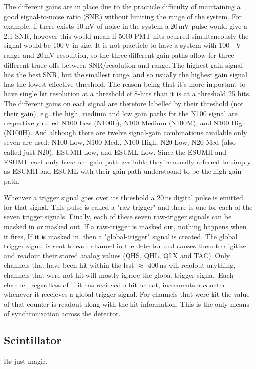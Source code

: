 The different gains are in place due to the practicle difficulty of maintaining
a good signal-to-noise ratio (SNR) without limiting the range of the
system.
For example, if there exists 10\,mV of noise in the system a 20\,mV pulse
would give a 2:1 SNR, however this would mean if 5000 PMT hits ocurred simultaneously
the signal would be 100\,V in size.
It is not practicle to have a system with 100+\,V range and 20\,mV resoultion,
so the three different gain paths allow for three different trade-offs between
SNR/resolution and range.
The highest gain signal has the best SNR, but the smallest range, and so usually
the highest gain signal has the lowest effective threshold.
The reason being that it's more important to have single hit resolution at a threshold
of 8-hits than it is at a threshold 25 hits.
The different gains on each signal are therefore labelled by their threshold (not their gain), e.g.
the high, medium and low gain paths for the N100 signal are respectively called
N100 Low (N100L), N100 Medium (N100M), and N100 High (N100H).
And although there are twelve signal-gain combinations available only seven are
used: N100-Low, N100-Med., N100-High, N20-Low, N20-Med (also called just N20), ESUMH-Low, and ESUML-Low.
Since the ESUMH and ESUML each only have one gain path available they're usually
referred to simply as ESUMH and ESUML with their gain path understoond to be
the high gain path.

Whenver a trigger signal goes over its threshold a 20\,ns digital pulse is
emitted for that signal. This pulse is called a "raw-trigger" and there is
one for each of the seven trigger signals.
Finally, each of these seven raw-trigger signals can be masked in or masked out.
If a raw-trigger is masked out, nothing happens when it fires,
If it is masked in, then a "global-trigger" signal is created.
The global trigger signal is sent to each channel in the detector and
causes them to digitize and readout their stored analog values (QHS, QHL, QLX and TAC).
Only channels that have been hit within the last $\approx$ 400\,ns will readout
anything, channels that were not hit will mostly ignore the global trigger signal.
Each channel, regardless of if it has recieved a hit or not, increments
a counter whenever it receieves a global trigger signal.
For channels that were hit the value of that counter is readout
along with the hit information.
This is the only means of synchronization across the detector.








\subsection{Scintillator}
Its just magic.

